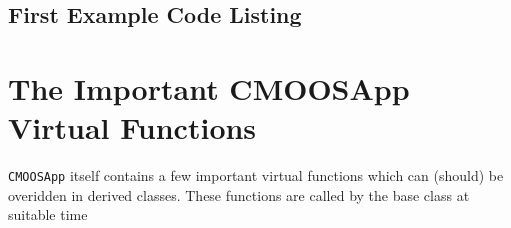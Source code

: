\documentclass[a4paper,10pt]{article}
\newcommand{\Code}[1]{\texttt{#1} }
\newcommand{\code}[1]{\Code{#1} }
\begin{document}
\subsection{First Example Code Listing}










\section{The Important CMOOSApp Virtual Functions}\label{Sec:MOOSAppVirtuals}

\code{CMOOSApp} itself contains a few important virtual functions
which can (should) be overidden in derived classes. These
functions are called by the base class at suitable time
\end{document}

